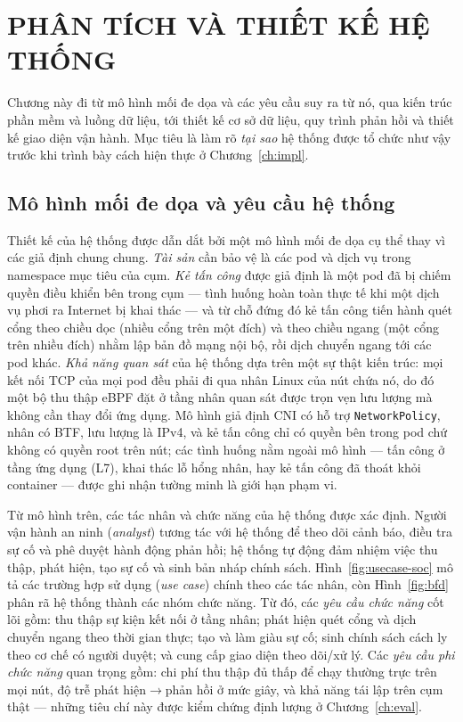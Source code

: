 
\chapter{PHÂN TÍCH VÀ THIẾT KẾ HỆ THỐNG}
\label{ch:design}

Chương này đi từ mô hình mối đe dọa và các yêu cầu suy ra từ nó, qua kiến trúc
phần mềm và luồng dữ liệu, tới thiết kế cơ sở dữ liệu, quy trình phản hồi và thiết
kế giao diện vận hành. Mục tiêu là làm rõ \emph{tại sao} hệ thống được tổ chức như
vậy trước khi trình bày cách hiện thực ở Chương~\ref{ch:impl}.

\section{Mô hình mối đe dọa và yêu cầu hệ thống}
\label{sec:threat-model}

Thiết kế của hệ thống được dẫn dắt bởi một mô hình mối đe dọa cụ thể thay vì các
giả định chung chung. \emph{Tài sản} cần bảo vệ là các pod và dịch vụ trong namespace
mục tiêu của cụm. \emph{Kẻ tấn công} được giả định là một pod đã bị chiếm quyền điều
khiển bên trong cụm --- tình huống hoàn toàn thực tế khi một dịch vụ phơi ra Internet
bị khai thác --- và từ chỗ đứng đó kẻ tấn công tiến hành quét cổng theo chiều dọc
(nhiều cổng trên một đích) và theo chiều ngang (một cổng trên nhiều đích) nhằm lập
bản đồ mạng nội bộ, rồi dịch chuyển ngang tới các pod khác. \emph{Khả năng quan sát}
của hệ thống dựa trên một sự thật kiến trúc: mọi kết nối TCP của mọi pod đều phải đi
qua nhân Linux của nút chứa nó, do đó một bộ thu thập eBPF đặt ở tầng nhân quan sát
được trọn vẹn lưu lượng mà không cần thay đổi ứng dụng. Mô hình giả định CNI có hỗ
trợ \texttt{NetworkPolicy}, nhân có BTF, lưu lượng là IPv4, và kẻ tấn công chỉ có
quyền bên trong pod chứ không có quyền root trên nút; các tình huống nằm ngoài mô
hình --- tấn công ở tầng ứng dụng (L7), khai thác lỗ hổng nhân, hay kẻ tấn công đã
thoát khỏi container --- được ghi nhận tường minh là giới hạn phạm vi.

Từ mô hình trên, các tác nhân và chức năng của hệ thống được xác định. Người vận
hành an ninh (\textit{analyst}) tương tác với hệ thống để theo dõi cảnh báo, điều tra
sự cố và phê duyệt hành động phản hồi; hệ thống tự động đảm nhiệm việc thu thập, phát
hiện, tạo sự cố và sinh bản nháp chính sách. Hình~\ref{fig:usecase-soc} mô tả các
trường hợp sử dụng (\textit{use case}) chính theo các tác nhân, còn
Hình~\ref{fig:bfd} phân rã hệ thống thành các nhóm chức năng. Từ đó, các \emph{yêu cầu
chức năng} cốt lõi gồm: thu thập sự kiện kết nối ở tầng nhân; phát hiện quét cổng và
dịch chuyển ngang theo thời gian thực; tạo và làm giàu sự cố; sinh chính sách cách ly
theo cơ chế có người duyệt; và cung cấp giao diện theo dõi/xử lý. Các \emph{yêu cầu
phi chức năng} quan trọng gồm: chi phí thu thập đủ thấp để chạy thường trực trên mọi
nút, độ trễ phát hiện$\rightarrow$phản hồi ở mức giây, và khả năng tái lập trên cụm
thật --- những tiêu chí này được kiểm chứng định lượng ở Chương~\ref{ch:eval}.

